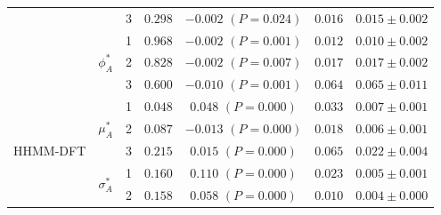 \documentclass{article}
\begin{document}
\begin{center}
{\begin{tabular}{ccccccc}
                            &                               & 3                                & $0.298$                         & $-0.002$ $(P=0.024)$          & $0.016$                             & $0.015 \pm 0.002$                             \\
                            & \multirow{3}{*}{$\phi_A^*$}   & 1                                & $0.968$                         & $-0.002$ $(P=0.001)$          & $0.012$                             & $0.010 \pm 0.002$                             \\
                            &                               & 2                                & $0.828$                         & $-0.002$ $(P=0.007)$          & $0.017$                             & $0.017 \pm 0.002$                             \\
                            &                               & 3                                & $0.600$                         & $-0.010$ $(P=0.001)$          & $0.064$                             & $0.065 \pm 0.011$                             \\ \hline
\multirow{9}{*}{HHMM-DFT}   & \multirow{3}{*}{$\mu_A^*$}    & 1                                & $0.048$                         & $0.048$ $(P=0.000)$          & $0.033$                             & $0.007 \pm 0.001$                             \\
                            &                               & 2                                & $0.087$                         & $-0.013$ $(P=0.000)$          & $0.018$                             & $0.006 \pm 0.001$                             \\
                            &                               & 3                                & $0.215$                         & $0.015$ $(P=0.000)$          & $0.065$                             & $0.022 \pm 0.004$                             \\
                            & \multirow{3}{*}{$\sigma_A^*$} & 1                                & $0.160$                         & $0.110$ $(P=0.000)$          & $0.023$                             & $0.005 \pm 0.001$                             \\
                            &                               & 2                                & $0.158$                         & $0.058$ $(P=0.000)$          & $0.010$                             & $0.004 \pm 0.000$                             \\ 

\end{tabular}}
\end{center}
\end{document}

